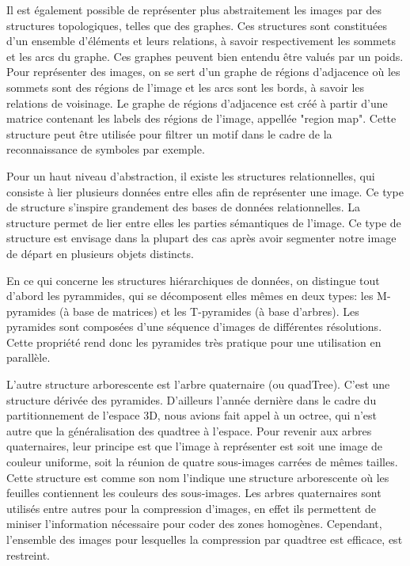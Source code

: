 \documentclass[]{report}
\begin{document}
      Il est également possible de représenter plus abstraitement les images par des structures topologiques, telles que des graphes. Ces structures sont constituées d'un ensemble d'éléments et leurs relations, à savoir respectivement les sommets et les arcs du graphe. Ces graphes peuvent bien entendu être valués par un poids. Pour représenter des images, on se sert d'un graphe de régions d'adjacence où les sommets sont des régions de l'image et les arcs sont les bords, à savoir les relations de voisinage. Le graphe de régions d'adjacence est créé à partir d'une matrice contenant les labels des régions de l'image, appellée "region map". Cette structure peut être utilisée pour filtrer un motif dans le cadre de la reconnaissance de symboles par exemple.


      Pour un haut niveau d'abstraction, il existe les structures relationnelles, qui consiste à lier plusieurs données entre elles afin de représenter une image. Ce type de structure s'inspire grandement des bases de données relationnelles. La structure permet de lier entre elles les parties sémantiques de l'image. Ce type de structure est envisage dans la plupart des cas après avoir segmenter notre image de départ en plusieurs objets distincts.


      En ce qui concerne les structures hiérarchiques de données, on distingue tout d'abord les pyrammides, qui se décomposent elles mêmes en deux types: les M-pyramides (à base de matrices) et les T-pyramides (à base d'arbres). Les pyramides sont composées d'une séquence d'images de différentes résolutions. Cette propriété rend donc les pyramides très pratique pour une utilisation en parallèle.

      L'autre structure arborescente est l'arbre quaternaire (ou quadTree). C'est une structure dérivée des pyramides. D'ailleurs l'année dernière dans le cadre du partitionnement de l'espace 3D, nous avions fait appel à un octree, qui n'est autre que la généralisation des quadtree à l'espace. Pour revenir aux arbres quaternaires, leur principe est que l'image à représenter est soit une image de couleur uniforme, soit la réunion de quatre sous-images carrées de mêmes tailles. Cette structure est comme son nom l'indique une structure arborescente où les feuilles contiennent les couleurs des sous-images. Les arbres quaternaires sont utilisés entre autres pour la compression d'images, en effet ils permettent de miniser l'information nécessaire pour coder des zones homogènes. Cependant, l'ensemble des images pour lesquelles la compression par quadtree est efficace, est restreint.
\end{document}
